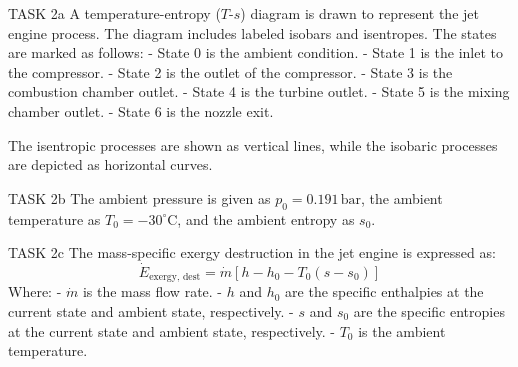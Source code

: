 TASK 2a  
A temperature-entropy (\(T\)-\(s\)) diagram is drawn to represent the jet engine process. The diagram includes labeled isobars and isentropes. The states are marked as follows:  
- State 0 is the ambient condition.  
- State 1 is the inlet to the compressor.  
- State 2 is the outlet of the compressor.  
- State 3 is the combustion chamber outlet.  
- State 4 is the turbine outlet.  
- State 5 is the mixing chamber outlet.  
- State 6 is the nozzle exit.  

The isentropic processes are shown as vertical lines, while the isobaric processes are depicted as horizontal curves.  

TASK 2b  
The ambient pressure is given as \( p_0 = 0.191 \, \text{bar} \), the ambient temperature as \( T_0 = -30^\circ\text{C} \), and the ambient entropy as \( s_0 \).  

TASK 2c  
The mass-specific exergy destruction in the jet engine is expressed as:  
\[
\dot{E}_{\text{exergy, dest}} = \dot{m} \left[ h - h_0 - T_0 (s - s_0) \right]
\]  
Where:  
- \( \dot{m} \) is the mass flow rate.  
- \( h \) and \( h_0 \) are the specific enthalpies at the current state and ambient state, respectively.  
- \( s \) and \( s_0 \) are the specific entropies at the current state and ambient state, respectively.  
- \( T_0 \) is the ambient temperature.